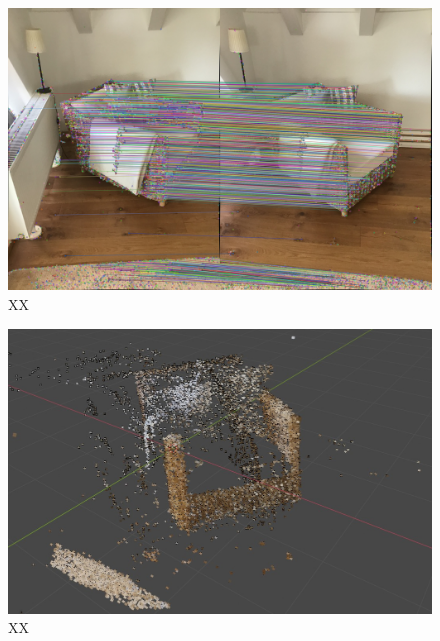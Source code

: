 \begin{figure}
    \includegraphics[width=\textwidth]{src/img/chair_first_pair_with_matches.jpg}
    \caption{XX}
    \label{fig:chair-first-pair-with-matches}
\end{figure}

\begin{figure}
    \includegraphics[width=\textwidth]{src/img/chair_model.jpg}
    \caption{XX}
    \label{fig:chair-model}
\end{figure}


